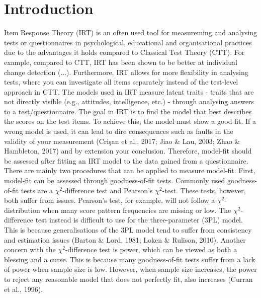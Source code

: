 \documentclass[Royal,sageapa,times,doublespace]{sagej}
\begin{document}
\section{Introduction}
Item Response Theory (IRT) is an often used tool for measureming and analysing tests or questionnaires in psychological, educational and organisational practices due to the advantages it holds compared to Classical Test Theory (CTT). For example, compared to CTT, IRT has been shown to be better at individual change detection (...). Furthermore, IRT allows for more flexibility in analysing tests, where you can investigate all items separately instead of the test-level approach in CTT. The models used in IRT measure latent traits - traits that are not directly visible (e.g., attitudes, intelligence, etc.) - through analysing answers to a test/questionnaire. The goal in IRT is to find the model that best describes the scores on the test items. To achieve this, the model must show a good fit. If a wrong model is used, it can lead to dire consequences such as faults in the validity of your measurement (Cri\c{s}an et al., 2017; Jiao \& Lau, 2003; Zhao \& Hambleton, 2017) and by extension your conclusion. Therefore, model-fit should be assessed after fitting an IRT model to the data gained from a questionnaire. \\
\indent There are mainly two procedures that can be applied to measure model-fit. First, model-fit can be assessed through goodness-of-fit tests. Commonly used goodness-of-fit tests are a $\chi^2$-difference test and Pearson's $\chi^2$-test. These tests, however, both suffer from issues. Pearson's test, for example, will not follow a $\chi^2$-distribution when many score pattern frequencies are missing or low. The $\chi^2$-difference test instead is difficult to use for the three-parameter (3PL) model. This is because generalisations of the 3PL model tend to suffer from consistency and estimation issues (Barton \& Lord, 1981; Loken \& Rulison, 2010). Another concern with the $\chi^2$-difference test is power, which can be viewed as both a blessing and a curse. This is because many goodness-of-fit tests suffer from a lack of power when sample size is low. However, when sample size increases, the power to reject any reasonable model that does not perfectly fit, also increases (Curran et al., 1996). \\
\end{document}
